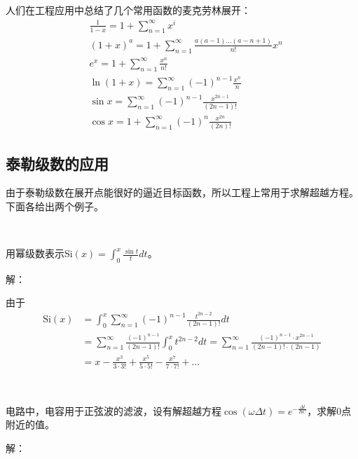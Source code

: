 人们在工程应用中总结了几个常用函数的麦克劳林展开：
\begin{align*}
&\frac{1}{1-x}=1+\sum_{n=1}^{\infty}{x^i} \\
&\left( 1+x \right) ^a=1+\sum_{n=1}^{\infty}{\frac{a\left( a-1 \right) ...\left( a-n+1 \right)}{n!}x^n} \\
&e^x=1+\sum_{n=1}^{\infty}{\frac{x^n}{n!}} \\
&\ln \left( 1+x \right) =\sum_{n=1}^{\infty}{\left( -1 \right) ^{n-1}\frac{x^n}{n}} \\
&\sin x=\sum_{n=1}^{\infty}{\left( -1 \right) ^{n-1}\frac{x^{2n-1}}{\left( 2n-1 \right) !}} \\
&\cos x=1+\sum_{n=1}^{\infty}{\left( -1 \right) ^n\frac{x^{2n}}{\left( 2n \right) !}}
\end{align*}

\subsection{泰勒级数的应用}

由于泰勒级数在展开点能很好的逼近目标函数，所以工程上常用于求解超越方程。
下面各给出两个例子。

~

\begin{example}
用幂级数表示$\mathrm{Si}\left( x \right) =\int_0^x{\frac{\sin t}{t}dt}$。
\end{example}

解：

由于
\begin{align*}
\mathrm{Si}\left( x \right) &=\int_0^x{\sum_{n=1}^{\infty}{\left( -1 \right) ^{n-1}\frac{t^{2n-2}}{\left( 2n-1 \right) !}}dt} \\
&=\sum_{n=1}^{\infty}{\frac{\left( -1 \right) ^{n-1}}{\left( 2n-1 \right) !}\int_0^x{t^{2n-2}dt}}=\sum_{n=1}^{\infty}{\frac{\left( -1 \right) ^{n-1}\cdot x^{2n-1}}{\left( 2n-1 \right) !\cdot \left( 2n-1 \right)}} \\
&=x-\frac{x^3}{3\cdot 3!}+\frac{x^5}{5\cdot 5!}-\frac{x^7}{7\cdot 7!}+...
\end{align*}

~

\begin{example}
电路中，电容用于正弦波的滤波，设有解超越方程$\cos \left( \omega \Delta t \right) =e^{-\frac{\Delta t}{RC}}$，求解0点附近的值。
\end{example}

解：

